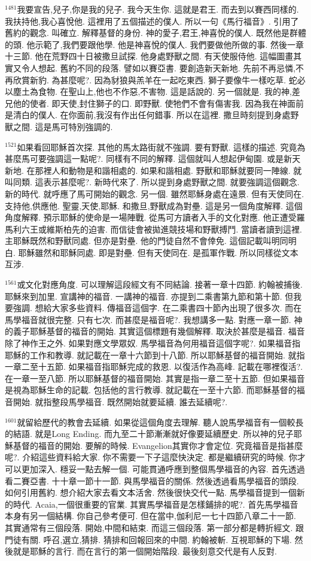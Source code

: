 \documentclass{book}
\begin{document}
$^{1481}$我要宣告,兒子,你是我的兒子.
我今天生你.
這就是君王.
而去到以賽西同樣的.
我扶持他,我心喜悅他.
這裡用了五個描述的僕人.
所以一句《馬行福音》.
引用了舊約的觀念.
叫確立.
解釋基督的身份.
神的愛子,君王,神喜悅的僕人.
既然他是群體的頭.
他示範了,我們要跟他學.
他是神喜悅的僕人.
我們要做他所做的事.
然後一章十三節.
他在荒野四十日被撒旦試探.
他身處野獸之間.
有天使服侍他.
這幅圖畫其實又令人想起.
舊約不同的段落.
譬如以賽亞書.
要創造新天新地.
先前不再忌憐,不再欣賞新豹.
為甚麼呢?.
因為豺狼與羔羊在一起吃東西.
獅子要像牛一樣吃草.
蛇必以塵土為食物.
在聖山上,他也不作惡,不害物.
這是話說的.
另一個就是.
我的神,差兄他的使者.
即天使,封住獅子的口.
即野獸.
使牠們不會有傷害我.
因為我在神面前是清白的僕人.
在你面前,我沒有作出任何錯事.
所以在這裡.
撒旦時刻提到身處野獸之間.
這是馬可特別強調的.

$^{1521}$如果看回耶穌首次探.
其他的馬太路街就不強調.
要有野獸.
這樣的描述.
究竟為甚麼馬可要強調這一點呢?.
同樣有不同的解釋.
這個就叫人想起伊甸園.
或是新天新地.
在那裡人和動物是和諧相處的.
如果和諧相處.
野獸和耶穌就要同一陣線.
就叫同類.
這表示甚麼呢?.
新時代來了.
所以提到身處野獸之間.
就要強調這個觀念.
新的時代.
就呼應了馬可開始的觀念.
另一個.
雖然耶穌身處在遠景.
但有天使同在.
支持他,供應他.
聖靈,天使,耶穌.
和撒旦,野獸成為對壘.
這是另一個角度解釋.
這個角度解釋.
預示耶穌的使命是一場陣戰.
從馬可方讀者入手的文化對應.
他正遭受羅馬利六王或維斯柏先的迫害.
而信徒會被拋進競技場和野獸搏鬥.
當讀者讀到這裡.
主耶穌既然和野獸同處.
但亦是對壘.
他的門徒自然不會倖免.
這個記載叫明同明白.
耶穌雖然和耶穌同處.
即是對壘.
但有天使同在.
是孤軍作戰.
所以同樣從文本互涉.

$^{1561}$或文化對應角度.
可以理解這段經文有不同結論.
接著一章十四節.
約翰被捕後.
耶穌來到加里.
宣講神的福音.
一講神的福音.
亦提到二乘書第九節和第十節.
但我要強調.
想給大家多些資料.
傳福音這個字.
在二乘書四十節內出現了很多次.
而在馬學福音就很完整.
只有七次.
而甚麼是福音呢?.
我想講多一點.
對應一章一節.
神的義子耶穌基督的福音的開始.
其實這個標題有幾個解釋.
取決於甚麼是福音.
福音除了神作王之外.
如果對應文學眾奴.
馬學福音為何用福音這個字呢?.
如果福音指耶穌的工作和教導.
就記載在一章十六節到十八節.
所以耶穌基督的福音開始.
就指一章二至十五節.
如果福音指耶穌完成的救恩.
以復活作為高峰.
記載在哪裡復活?.
在一章一至八節.
所以耶穌基督的福音開始.
其實是指一章二至十五節.
但如果福音是視為耶穌生命的記載.
包括他的言行教導.
就記載在一至十六節.
而耶穌基督的福音開始.
就指整段馬學福音.
既然開始就要延續.
誰去延續呢?.

$^{1601}$就留給歷代的教會去延續.
如果從這個角度去理解.
聽人說馬學福音有一個較長的結語.
就是Long Ending.
而九至二十節漸漸就好像要延續歷史.
所以神的兒子耶穌基督的福音的開始.
要解的時候.
Evangelion其實你才會定位.
究竟福音是指甚麼呢?.
介紹這些資料給大家.
你不需要一下子這麼快決定.
都是繼續研究的時候.
你才可以更加深入.
穩妥一點去解一個.
可能貫通呼應到整個馬學福音的內容.
首先透過看二賽亞書.
十十章一節十一節.
與馬學福音的關係.
然後透過看馬學福音的頭段.
如何引用舊約.
想介紹大家去看文本活舍.
然後很快交代一點.
馬學福音提到一個新的時代.
Acaia,一個很重要的官業.
其實馬學福音是怎樣鋪排的呢?.
首先馬學福音本身有另一個結構.
你自己參考便可.
但在當中,伽利尼一七十四節八章二十一節.
其實通常有三個段落.
開始,中間和結束.
而這三個段落.
第一部分都是轉折經文.
跟門徒有關.
呼召,選立,猜排.
猜排和回報回來的中間.
約翰被斬.
互視耶穌的下場.
然後就是耶穌的言行.
而在言行的第一個開始階段.
最後刻意交代是有人反對.
\end{document}
